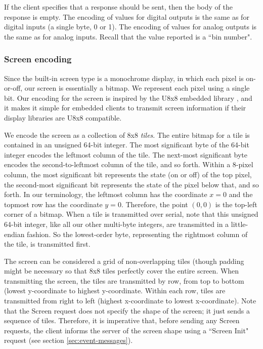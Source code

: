 \documentclass[12pt]{article}
\begin{document}
\begin{appendices}
If the client specifies that a response should be sent, then the body of the response is empty.  The encoding of values for digital outputs is the same as for digital inputs (a single byte, 0 or 1).  The encoding of values for analog outputs is the same as for analog inputs.  Recall that the value reported is a ``bin number".

\subsubsection{Screen encoding}
Since the built-in screen type is a monochrome display, in which each pixel is on-or-off, our screen is essentially a bitmap.  We represent each pixel using a single bit.  Our encoding for the screen is inspired by the U8x8 embedded library \cite{u8x8}, and it makes it simple for embedded clients to transmit screen information if their display libraries are U8x8 compatible.

We encode the screen as a collection of 8x8 \textit{tiles}.  The entire bitmap for a tile is contained in an unsigned 64-bit integer.  The most significant byte of the 64-bit integer encodes the leftmost column of the tile.  The next-most significant byte encodes the second-to-leftmost column of the tile, and so forth.  Within a 8-pixel column, the most significant bit represents the state (on or off) of the top pixel, the second-most significant bit represents the state of the pixel below that, and so forth.  In our terminology, the leftmost column has the coordinate $x=0$ and the topmost row has the coordinate $y=0$.  Therefore, the point $(0, 0)$ is the top-left corner of a bitmap.  When a tile is transmitted over serial, note that this unsigned 64-bit integer, like all our other multi-byte integers, are transmitted in a little-endian fashion.  So the lowest-order byte, representing the rightmost column of the tile, is transmitted first.

The screen can be considered a grid of non-overlapping tiles (though padding might be necessary so that 8x8 tiles perfectly cover the entire screen.  When transmitting the screen, the tiles are transmitted by row, from top to bottom (lowest y-coordinate to highest y-coordinate.  Within each row, tiles are transmitted from right to left (highest x-coordinate to lowest x-coordinate).  Note that the Screen request does not specify the shape of the screen; it just sends a sequence of tiles.  Therefore, it is imperative that, before sending any Screen requests, the client informs the server of the screen shape using a ``Screen Init" request (see section \ref{sec:event-messages}).


\end{appendices}
\end{document}

